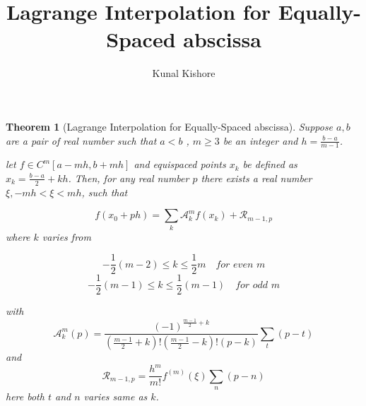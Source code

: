 \documentclass{article}
\title{Lagrange Interpolation for Equally-Spaced abscissa}
\author{Kunal Kishore }
\date{}
\newtheorem*{theorem*}{Theorem}
\begin{document}
\maketitle


\begin{theorem*}[Lagrange Interpolation for Equally-Spaced abscissa]

Suppose $a,b$ are a pair of real number such that $a<b$ , $m \ge 3$ be an integer and $h = \frac{b-a}{m-1}$. 

let $f \in C^{m}[a-mh,b+mh]$ and equispaced points $x_k$ be defined as  $x_k  = \frac{b-a}{2} +kh$.
Then, for any real number $p$ there exists a real number 
$\xi , -mh <\xi<mh $, such that

\begin{equation}
    f(x_0 + ph) = \sum_{k} \mathcal{A}_{k}^{m} f(x_k) + \mathcal{R}_{m-1,p}
\end{equation}
where $k$ varies from



$$
-\frac{1}{2}(m-2) \leq k \leq \frac{1}{2}m  \quad 
\textit{for even m}
$$
$$
-\frac{1}{2}(m-1) \leq k \leq \frac{1}{2}(m-1)  \quad 
\textit{for odd m}
$$

with
$$
\mathcal{A}_{k}^{m}(p) = 
\frac{ (-1)^{\frac{m-1}{2}+k} }{
(\frac{m-1}{2} + k)!
(\frac{m-1}{2} - k)!
(p-k)}
\sum_{t}(p-t)
$$
and
$$
\mathcal{R}_{m-1,p} = \frac{ h^{m} }{m!} f^{(m)}(\xi)
\sum_{n} (p-n)
$$
here both $t$ and $n$ varies same as $k$. 
\end{theorem*}
\end{document}
